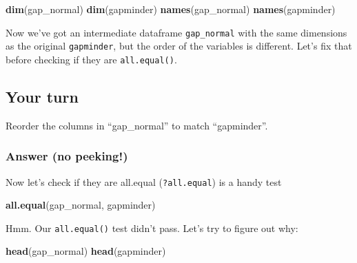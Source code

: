 \documentclass[]{book}
\newenvironment{Shaded}{\begin{snugshade}}{\end{snugshade}}
\newcommand{\KeywordTok}[1]{\textcolor[rgb]{0.13,0.29,0.53}{\textbf{{#1}}}}
\newcommand{\StringTok}[1]{\textcolor[rgb]{0.31,0.60,0.02}{{#1}}}
\newcommand{\CommentTok}[1]{\textcolor[rgb]{0.56,0.35,0.01}{\textit{{#1}}}}
\newcommand{\NormalTok}[1]{{#1}}
\theoremstyle{definition}
\theoremstyle{definition}
\theoremstyle{definition}
\theoremstyle{remark}
\begin{document}
\begin{Shaded}
\begin{Highlighting}[]
\KeywordTok{dim}\NormalTok{(gap_normal)}
\KeywordTok{dim}\NormalTok{(gapminder)}
\KeywordTok{names}\NormalTok{(gap_normal)}
\KeywordTok{names}\NormalTok{(gapminder)}
\end{Highlighting}
\end{Shaded}

Now we've got an intermediate dataframe \texttt{gap\_normal} with the
same dimensions as the original \texttt{gapminder}, but the order of the
variables is different. Let's fix that before checking if they are
\texttt{all.equal()}.

\subsection{Your turn}\label{your-turn-10}

Reorder the columns in ``gap\_normal'' to match ``gapminder''.

\subsubsection{Answer (no peeking!)}\label{answer-no-peeking-1}

\begin{Shaded}
\end{Shaded}

Now let's check if they are all.equal (\texttt{?all.equal}) is a handy
test

\begin{Shaded}
\begin{Highlighting}[]
\KeywordTok{all.equal}\NormalTok{(gap_normal, gapminder)}
\end{Highlighting}
\end{Shaded}

Hmm. Our \texttt{all.equal()} test didn't pass. Let's try to figure out
why:

\begin{Shaded}
\begin{Highlighting}[]
\KeywordTok{head}\NormalTok{(gap_normal)}
\KeywordTok{head}\NormalTok{(gapminder)}
\end{Highlighting}
\end{Shaded}
\end{document}
